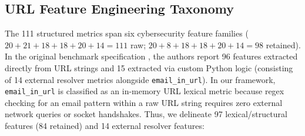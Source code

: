 \subsection{URL Feature Engineering Taxonomy}
The 111 structured metrics span six cybersecurity feature families ($20 + 21 + 18 + 18 + 20 + 14 = 111$ raw; $20 + 8 + 18 + 18 + 20 + 14 = 98$ retained). In the original benchmark specification \cite{vrbancic2020datasets}, the authors report 96 features extracted directly from URL strings and 15 extracted via custom Python logic (consisting of 14 external resolver metrics alongside \texttt{email\_in\_url}). In our framework, \texttt{email\_in\_url} is classified as an in-memory URL lexical metric because regex checking for an email pattern within a raw URL string requires zero external network queries or socket handshakes. Thus, we delineate 97 lexical/structural features (84 retained) and 14 external resolver features:
